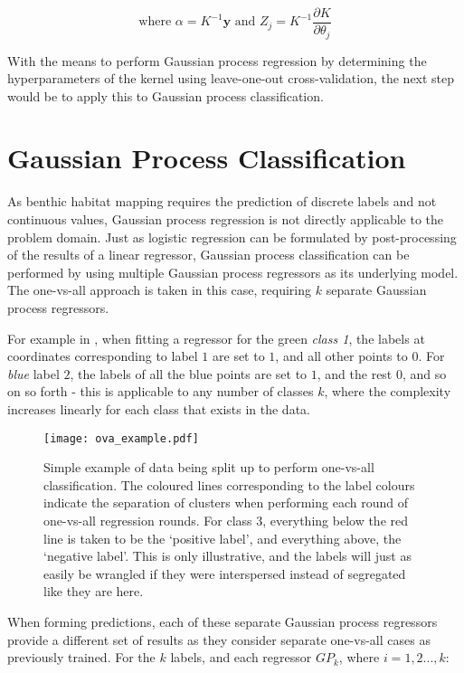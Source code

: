 $$ \text{where } \alpha = K^{-1}\mathbf{y} \text{ and } Z_j = K^{-1} \frac{\partial{K}}{\partial{\theta_j}} $$

With the means to perform Gaussian process regression by determining the hyperparameters of the kernel using leave-one-out cross-validation, the next step would be to apply this to Gaussian process classification.

\section{Gaussian Process Classification} \label{chapsec:gpc}

As benthic habitat mapping requires the prediction of discrete labels and not continuous values, Gaussian process regression is not directly applicable to the problem domain. Just as logistic regression can be formulated by post-processing of the results of a linear regressor, Gaussian process classification can be performed by using multiple Gaussian process regressors as its underlying model. The one-vs-all approach is taken in this case, requiring $k$ separate Gaussian process regressors.

For example in , when fitting a regressor for the green \textit{class 1}, the labels at coordinates corresponding to label $1$ are set to $1$, and all other points to $0$. For \textit{blue} label $2$, the labels of all the blue points are set to $1$, and the rest $0$, and so on so forth - this is applicable to any number of classes $k$, where the complexity increases linearly for each class that exists in the data.

\begin{figure}
    \texttt{[image: ova\_example.pdf]}
    \caption{Simple example of data being split up to perform one-vs-all classification. The coloured lines corresponding to the label colours indicate the separation of clusters when performing each round of one-vs-all regression rounds. For class $3$, everything below the red line is taken to be the `positive label', and everything above, the `negative label'. This is only illustrative, and the labels will just as easily be wrangled if they were interspersed instead of segregated like they are here.}
    \label{fig:ova-example}
\end{figure}

When forming predictions, each of these separate Gaussian process regressors provide a different set of results as they consider separate one-vs-all cases as previously trained. For the $k$ labels, and each regressor $GP_k$, where $i=1,2...,k$:


